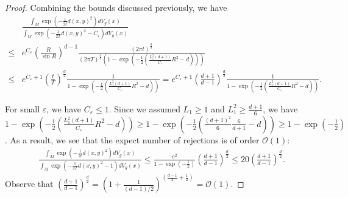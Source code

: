 \begin{proof}
    Combining the bounds discussed previously, we have 
    \begin{align*}
            &\frac{\int_{M} \exp(-\frac{1}{2t} d(x, y)^{2}) dV_{g}(x)}
            {\int_{M} \exp(-\frac{1}{2T} d(x, y)^{2} - C_{\varepsilon})dV_{g}(x)}
            \\
            \le& e^{C_{\varepsilon}} (\frac{R}{\sin R})^{d-1}
            \frac{(2\pi t)^{\frac{d}{2}}}{ (2\pi T)^{\frac{d}{2}}
            (1 - \exp(-\frac{1}{2}( \frac{L_{1}^{2} (d+1)}{C_{\varepsilon}} R^{2} - d)))} \\
            \le& e^{C_{\varepsilon}+1} (\frac{t}{T})^{\frac{d}{2}}
            \frac{1}{ 1 - \exp(-\frac{1}{2}( \frac{L_{1}^{2} (d+1)}{C_{\varepsilon}}R^{2} - d))}
            = e^{C_{\varepsilon}+1}(\frac{d+1}{d-1})^{\frac{d}{2}}
            \frac{1}{ 1 - \exp(-\frac{1}{2}( \frac{L_{1}^{2} (d+1)}{C_{\varepsilon}}R^{2} - d))}.
    \end{align*}

    For small $\varepsilon$, we have $C_{\varepsilon} \le 1$.
    Since we assumed $L_{1} \ge 1$ and $L_{1}^{2} \ge \frac{d+1}{6}$, we have 
    $1 - \exp(-\frac{1}{2}( \frac{L_{1}^{2} (d+1)}{C_{\varepsilon}}R^{2} - d)) \ge 1 - \exp(-\frac{1}{2}( \frac{(d+1)^{2}}{6}\frac{6}{d+1} - d)) \ge 1 - \exp(-\frac{1}{2})$. As a result, we see that the expect number of rejections is of order $\mathcal{O}(1)$:
    \begin{align*}
            &\frac{\int_{M} \exp(-\frac{1}{2t} d(x, y)^{2}) dV_{g}(x)}
            {\int_{M} \exp(-\frac{1}{2T} d(x, y)^{2} - 1)dV_{g}(x)}
            \le 
            \frac{e^{2}}{ 1 - \exp(-\frac{1}{2})}(\frac{d+1}{d-1})^{\frac{d}{2}}
            \le 20 (\frac{d+1}{d-1})^{\frac{d}{2}}.
    \end{align*}
    Observe that $(\frac{d+1}{d-1})^{\frac{d}{2}} = (1 + \frac{1}{(d-1)/2})^{(\frac{d-1}{2} + \frac{1}{2})} = \mathcal{O}(1)$.

\end{proof}

